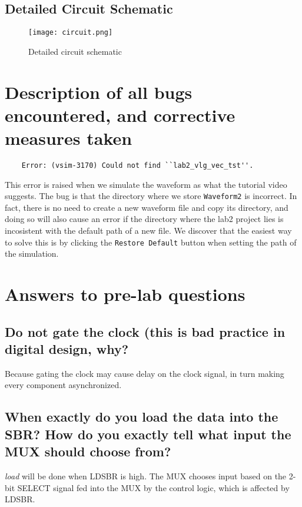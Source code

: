 \documentclass[12pt]{article}
\begin{document}
\subsection{Detailed Circuit Schematic}
\begin{figure}[h]
    \centering
    \texttt{[image: circuit.png]}
    \caption{Detailed circuit schematic}
    \label{circuit}
\end{figure}



\section{Description of all bugs encountered, and corrective measures taken}
\begin{lstlisting}
    Error: (vsim-3170) Could not find ``lab2_vlg_vec_tst''.
\end{lstlisting}
This error is raised when we simulate the waveform as what the tutorial video suggests. The bug is that the directory where we store \verb|Waveform2| is incorrect. In fact, there is no need to create a new waveform file and copy its directory, and doing so will also cause an error if the directory where the lab2 project lies is incosistent with the default path of a new file. We discover that the easiest way to solve this is by clicking the \verb|Restore Default| button when setting the path of the simulation.

\section{Answers to pre-lab questions}
\subsection{Do not gate the clock (this is bad practice in digital design, why?}
Because gating the clock may cause delay on the clock signal, in turn making every component asynchronized.

\subsection{When exactly do you load the data into the SBR? How do you exactly tell what input the MUX should choose from?}
\textit{load} will be done when LDSBR is high. The MUX chooses input based on the 2-bit SELECT signal fed into the MUX by the control logic, which is affected by LDSBR.

\end{document}
